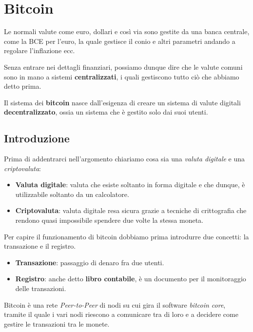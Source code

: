 \chapter{Bitcoin}
Le normali valute come euro, dollari e cos\`i via sono gestite da una banca centrale, come la BCE per l'euro, la quale
gestisce il conio e altri parametri andando a regolare l'inflazione ecc.

Senza entrare nei dettagli finanziari, possiamo dunque dire che le valute comuni sono in mano a sistemi
\textbf{centralizzati}, i quali gestiscono tutto ci\`o che abbiamo detto prima.

Il sistema dei \textbf{bitcoin} nasce dall'esigenza di creare un sistema di valute digitali \textbf{decentralizzato},
ossia un sistema che \`e gestito solo dai suoi utenti.

\section{Introduzione}
Prima di addentrarci nell'argomento chiariamo cosa sia una \emph{valuta digitale} e una \emph{criptovaluta}:
\begin{itemize}
	\item \textbf{Valuta digitale}: valuta che esiste soltanto in forma digitale e che dunque, \`e utilizzabile
	      soltanto da un calcolatore.
	\item \textbf{Criptovaluta}: valuta digitale resa sicura grazie a tecniche di crittografia che rendono quasi
	      impossibile spendere due volte la stessa moneta.
\end{itemize}
Per capire il funzionamento di bitcoin dobbiamo prima introdurre due concetti: la transazione e il registro.
\begin{itemize}
	\item \textbf{Transazione}: passaggio di denaro fra due utenti.
	\item \textbf{Registro}: anche detto \textbf{libro contabile}, \`e un documento per il monitoraggio delle
	      transazioni.
\end{itemize}
Bitcoin \`e una rete \emph{Peer-to-Peer} di nodi su cui gira il software \emph{bitcoin core}, tramite il quale
i vari nodi riescono a comunicare tra di loro e a decidere come gestire le transazioni tra le monete.

